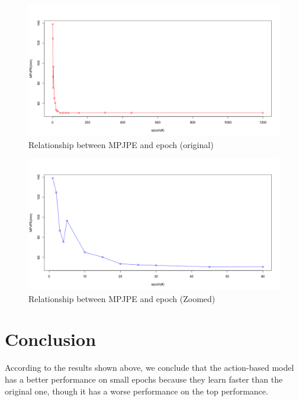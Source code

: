 \documentclass[10pt,twocolumn,letterpaper]{article}
\begin{document}
\begin{figure}
	\begin{center}
  		\includegraphics[width=0.9\linewidth]{MPJPE_epoch_overall.png}
	\end{center}
   	\caption{Relationship between MPJPE and epoch (original)}
	\label{fig:long}
	\label{fig:onecol}
\end{figure}



\begin{figure}
	\begin{center}
  		\includegraphics[width=0.9\linewidth]{MPJPE_epoch_zoomed.png}
	\end{center}
   	\caption{Relationship between MPJPE and epoch (Zoomed)}
	\label{fig:long}
	\label{fig:onecol}
\end{figure}

\section{Conclusion}
According to the results shown above, we conclude that the action-based model has a better performance on small epochs because 
they learn faster than the original one, though it has a worse performance on the top performance.


\newpage

{\small


}
\end{document}
